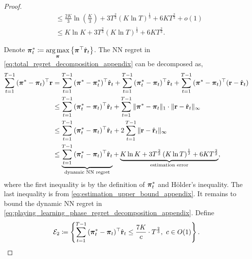 \begin{proof}
\begin{equation}
\begin{split}
    &\le \frac{2 K}{3} \ln{\left(\frac{K}{3}\right) } + 3 T^{\frac{2}{3}} \left( K \ln{T} \right) ^\frac{1}{3} + 6 K T^{\frac{2}{3}} + o(1) \\
    &\le K \ln{K} + 3 T^{\frac{2}{3}} \left( K \ln{T} \right) ^\frac{1}{3} + 6 K T^{\frac{2}{3}}.
\end{split}
\end{equation}

Denote ${\boldsymbol{\pi}}_t^* \coloneqq \operatorname*{arg\,max}\limits_{{\boldsymbol{\pi}}}{\left\{ {\boldsymbol{\pi}}^\top \hat{{\mathbf{r}}}_t\right\}}$. The NN regret in \cref{eq:total_regret_decomposition_appendix} can be decomposed as,
\begin{equation}
\label{eq:playing_learning_phase_regret_decomposition_appendix}
\begin{split}
    \sum\limits_{t=1}^{T-1}{ ( {{\boldsymbol{\pi}}^*} - {\boldsymbol{\pi}}_t )^\top {\mathbf{r}} } &=  \sum\limits_{t=1}^{T-1}{ ( {{\boldsymbol{\pi}}^*} - {{\boldsymbol{\pi}}_t^*} )^\top \hat{{\mathbf{r}}}_t } +  \sum\limits_{t=1}^{T-1}{ ( {{\boldsymbol{\pi}}_t^*} - {\boldsymbol{\pi}}_t )^\top \hat{{\mathbf{r}}}_t } +  \sum\limits_{t=1}^{T-1}{ ( {{\boldsymbol{\pi}}^*} - {\boldsymbol{\pi}}_t )^\top ( {\mathbf{r}} - \hat{{\mathbf{r}}}_t ) } \\
    &\le  \sum\limits_{t=1}^{T-1}{ ( {{\boldsymbol{\pi}}_t^*} - {\boldsymbol{\pi}}_t )^\top \hat{{\mathbf{r}}}_t }  + \sum\limits_{t=1}^{T-1}{ \| {\boldsymbol{\pi}}^* - {\boldsymbol{\pi}}_t \|_1 \cdot \| {\mathbf{r}} - \hat{{\mathbf{r}}}_t \|_\infty } \\
    &\le  \sum\limits_{t=1}^{T-1}{ ( {{\boldsymbol{\pi}}_t^*} - {\boldsymbol{\pi}}_t )^\top \hat{{\mathbf{r}}}_t } + 2  \sum\limits_{t=1}^{T-1}{ \| {\mathbf{r}} - \hat{{\mathbf{r}}}_t \|_\infty } \\
    &\le \underbrace{ \sum\limits_{t=1}^{T-1}{ ( {{\boldsymbol{\pi}}_t^*} - {\boldsymbol{\pi}}_t )^\top \hat{{\mathbf{r}}}_t } }_{\text{dynamic NN regret}} + \underbrace{K \ln{K} + 3 T^{\frac{2}{3}} \left( K \ln{T} \right) ^\frac{1}{3} + 6 K T^{\frac{2}{3}}}_{\text{estimation error}},
\end{split}
\end{equation}
where the first inequality is by the definition of ${\boldsymbol{\pi}}_t^*$ and  H{\"o}lder's inequality. The last inequality is from \cref{eq:estimation_upper_bound_appendix}. It remains to bound the dynamic NN regret in \cref{eq:playing_learning_phase_regret_decomposition_appendix}. Define
\begin{equation*}
    {\mathcal{E}}_2 \coloneqq \left\{ \sum\limits_{t=1}^{T-1}{ (  {{\boldsymbol{\pi}}_t^*} - {\boldsymbol{\pi}}_t )^\top \hat{{\mathbf{r}}}_t } \le \frac{7 K}{c} \cdot  T^{\frac{2}{3}}, \ c \in O(1) \right\}.
\end{equation*}


\end{proof}
